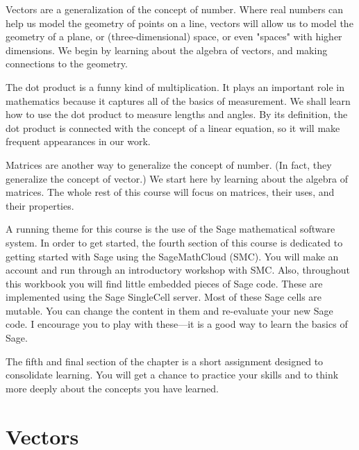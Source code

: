 \documentclass[10pt,]{book}
\theoremstyle{plain}
\theoremstyle{definition}
\numberwithin{equation}{section}
\begin{document}
      Vectors are a generalization of the concept of number. Where real numbers
      can help us model the geometry of points on a line, vectors will allow us to
      model the geometry of a plane, or (three-dimensional) space, or even "spaces"
      with higher dimensions. We begin by learning about the algebra of vectors,
      and making connections to the geometry.
\par

      The dot product is a funny kind of multiplication. It plays an important
      role in mathematics because it captures all of the basics of measurement.
      We shall learn how to use the dot product to measure lengths and angles. By
      its definition, the dot product is connected with the concept of a linear
      equation, so it will make frequent appearances in our work.
\par

      Matrices are another way to generalize the concept of number. (In fact, they
      generalize the concept of vector.) We start here by learning about the
      algebra of matrices. The whole rest of this course will focus on matrices,
      their uses, and their properties.
\par

      A running theme for this course is the use of the Sage mathematical software
      system. In order to get started, the fourth section of this course is
      dedicated to getting started with Sage using the SageMathCloud (SMC). You will
      make an account and run through an introductory workshop with SMC.
      Also, throughout this workbook you will find little embedded pieces of Sage
      code. These are implemented using the Sage SingleCell server. Most of these
      Sage cells are mutable. You can change the content in them and re-evaluate
      your new Sage code. I encourage you to play with these---it is a good way to
      learn the basics of Sage.
\par

      The fifth and final section of the chapter is a short assignment designed to
      consolidate learning. You will get a chance to practice your skills and to
      think more deeply about the concepts you have learned.
\typeout{************************************************}
\typeout{************************************************}
\section[Vectors]{Vectors}\label{vectors}
\typeout{************************************************}
\typeout{************************************************}
\end{document}
